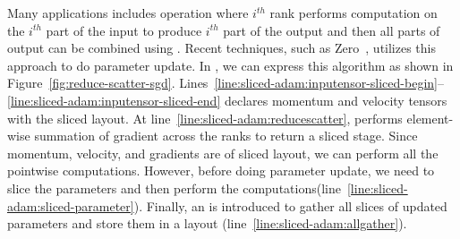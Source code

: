 Many applications includes operation where $i^{th}$ rank performs computation on the $i^{th}$ part of the input to produce $i^{th}$ part of the output and then all parts of output can be combined using \allgather.
Recent techniques, such as Zero~\cite{zero}, utilizes this approach to do parameter update.
In \tool, we can express this algorithm as shown in Figure~\ref{fig:reduce-scatter-sgd}.
Lines~\ref{line:sliced-adam:inputensor-sliced-begin}--\ref{line:sliced-adam:inputensor-sliced-end} declares momentum and velocity tensors  
with the sliced layout.
At line~\ref{line:sliced-adam:reducescatter}, \reducescatter performs element-wise summation of gradient across the ranks to return a sliced stage.
Since momentum, velocity, and gradients are of sliced layout, we can perform all the pointwise computations.
However, before doing parameter update, we need to slice the parameters and then perform the computations(line~\ref{line:sliced-adam:sliced-parameter}).
Finally, an \allgather is introduced to gather all slices of updated parameters and store them in a \replicated layout (line~\ref{line:sliced-adam:allgather}).
\fi



\iffalse

\subsubsection{Mixed Precisions}

\tool supports mixed precision applications where tensors can be of different type using its \texttt{Cast} construct, which cast all elements of the tensor to other type.
For example, in a parameter update that takes parameters in 32-bit Floats but gradients in 16-bit Floats, a \texttt{Cast} computation on gradients will cast all gradients from 16-bit Floats to 32-bit Floats.

\subsubsection{Tensor Reduction}
Many applications requires a reduction over tensors, such as, calculating the norm. 
For example, LAMB Optimizer~\cite{} calculates the norm of parameters and uses this norm in the parameter update. 
\tool provides \texttt{ReduceTensor} construct to perform a reduction computation on a tensor.
\texttt{ReduceTensor} supports several reduction operators, such as, sum, max, min.
\texttt{ReduceTensor} supports performing reduction on both \complete and sliced tensors and outputs a \texttt{Stage} containing a single element.
\fi

